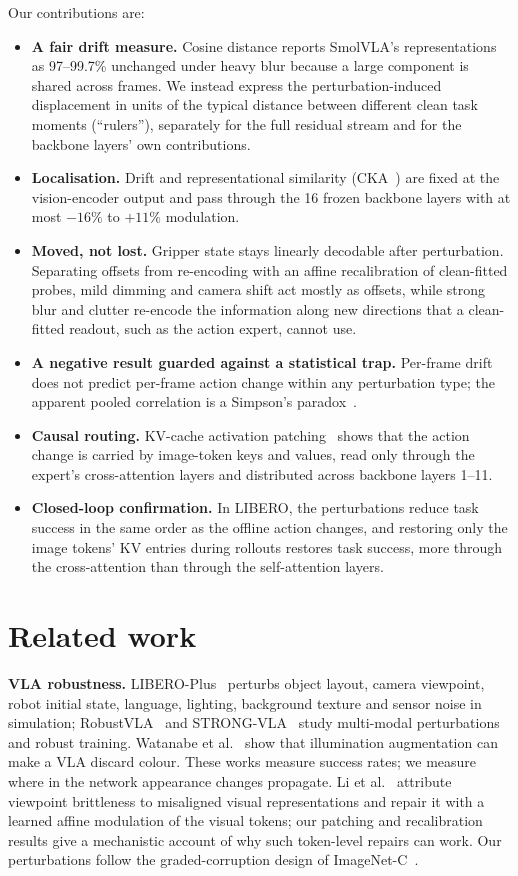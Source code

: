 \documentclass[conference]{IEEEtran}
\begin{document}
Our contributions are:
\begin{itemize}
  \item \textbf{A fair drift measure.} Cosine distance reports SmolVLA's representations as 97--99.7\% unchanged under heavy blur because a large component is shared across frames. We instead express the perturbation-induced displacement in units of the typical distance between different clean task moments (``rulers''), separately for the full residual stream and for the backbone layers' own contributions.
  \item \textbf{Localisation.} Drift and representational similarity (CKA~\cite{kornblith2019cka}) are fixed at the vision-encoder output and pass through the 16 frozen backbone layers with at most $-16\%$ to $+11\%$ modulation.
  \item \textbf{Moved, not lost.} Gripper state stays linearly decodable after perturbation. Separating offsets from re-encoding with an affine recalibration of clean-fitted probes, mild dimming and camera shift act mostly as offsets, while strong blur and clutter re-encode the information along new directions that a clean-fitted readout, such as the action expert, cannot use.
  \item \textbf{A negative result guarded against a statistical trap.} Per-frame drift does not predict per-frame action change within any perturbation type; the apparent pooled correlation is a Simpson's paradox~\cite{simpson1951}.
  \item \textbf{Causal routing.} KV-cache activation patching~\cite{meng2022rome,zhang2024patching} shows that the action change is carried by image-token keys and values, read only through the expert's cross-attention layers and distributed across backbone layers 1--11.
  \item \textbf{Closed-loop confirmation.} In LIBERO, the perturbations reduce task success in the same order as the offline action changes, and restoring only the image tokens' KV entries during rollouts restores task success, more through the cross-attention than through the self-attention layers.
\end{itemize}

\section{Related work}
\textbf{VLA robustness.} LIBERO-Plus~\cite{fei2025liberoplus} perturbs object layout, camera viewpoint, robot initial state, language, lighting, background texture and sensor noise in simulation; RobustVLA~\cite{guo2025robustvla} and STRONG-VLA~\cite{xie2026strongvla} study multi-modal perturbations and robust training. Watanabe et al.~\cite{watanabe2026lights} show that illumination augmentation can make a VLA discard colour. These works measure success rates; we measure where in the network appearance changes propagate. Li et al.~\cite{li2025generalizable} attribute viewpoint brittleness to misaligned visual representations and repair it with a learned affine modulation of the visual tokens; our patching and recalibration results give a mechanistic account of why such token-level repairs can work. Our perturbations follow the graded-corruption design of ImageNet-C~\cite{hendrycks2019imagenetc}.
\end{document}
